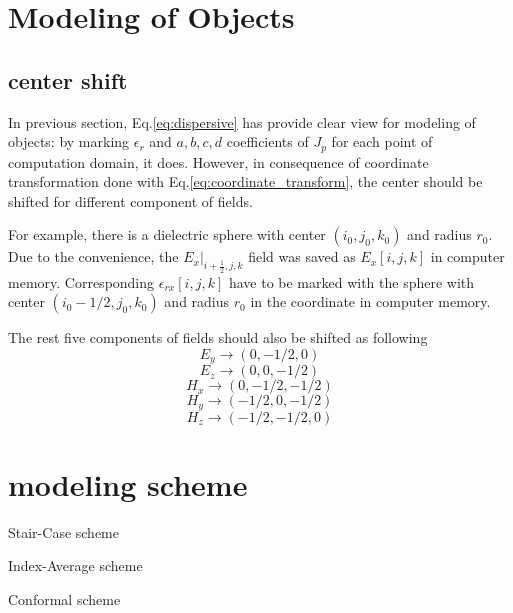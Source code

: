 \section{Modeling of Objects}
\label{sec:modeling}

\subsection{center shift}
In previous section, Eq.\ref{eq:dispersive} has provide clear view for modeling of objects: by marking $\epsilon_r$ and
$a, b, c,d$ coefficients of $J_p$ for each point of computation domain, it does. However, in consequence of coordinate
transformation done with Eq.\ref{eq:coordinate_transform}, the center should be shifted for different component of
fields.

For example, there is a dielectric sphere with center $(i_0,j_0,k_0)$ and radius $r_0$. Due to the convenience, the
$E_x|_{i+\frac{1}{2},j,k}$ field was saved as $E_x[i,j,k]$ in computer memory. Corresponding $\epsilon_{rx}[i,j,k]$ have
to be marked with the sphere with center $(i_0-1/2, j_0, k_0)$ and radius $r_0$ in the coordinate in computer memory.

The rest five components of fields should also be shifted as following
\begin{displaymath}
  E_y \rightarrow (0,-1/2,0)
\end{displaymath}
\begin{displaymath}
  E_z \rightarrow (0,0,-1/2)
\end{displaymath}
\begin{displaymath}
  H_x \rightarrow (0,-1/2,-1/2)
\end{displaymath}
\begin{displaymath}
  H_y \rightarrow (-1/2,0,-1/2)
\end{displaymath}
\begin{displaymath}
  H_z \rightarrow (-1/2,-1/2,0)
\end{displaymath}

\section{modeling scheme}
Stair-Case scheme

Index-Average scheme

Conformal scheme

